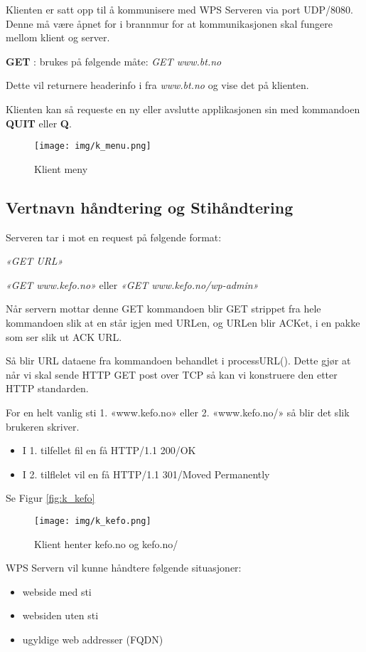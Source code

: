 \documentclass[norsk,a4paper]{article}
\begin{document}
Klienten er satt opp til å kommunisere med WPS Serveren via port UDP/8080.
Denne må være åpnet for i brannmur for at kommunikasjonen skal fungere mellom klient og server.

\textbf{GET} : brukes på følgende måte:
\textit{GET www.bt.no}

Dette vil returnere headerinfo i fra \textit{www.bt.no} og vise det på klienten.

Klienten kan så requeste en ny eller avslutte applikasjonen sin med kommandoen \textbf{QUIT} eller \textbf{Q}.

\begin{figure}[ht!]
  \texttt{[image: img/k\_menu.png]}
  \caption{Klient meny}
  \label{fig:klient_meny}
\end{figure}

\subsection{Vertnavn håndtering og Stihåndtering}
Serveren tar i mot en request på følgende format:

\textit{«GET URL»}

\textit{«GET www.kefo.no»} eller \textit{«GET www.kefo.no/wp-admin»}

Når servern mottar denne GET kommandoen blir GET strippet fra hele kommandoen slik at en står igjen med URLen, og URLen blir ACKet, i en pakke som ser slik ut ACK URL.

Så blir URL dataene fra kommandoen behandlet i processURL().
Dette gjør at når vi skal sende HTTP GET post over TCP så kan vi konstruere den etter HTTP standarden.

For en helt vanlig sti 1. «www.kefo.no» eller 2. «www.kefo.no/» så blir det slik brukeren skriver.
\begin{itemize}
  \item I 1. tilfellet fil en få HTTP/1.1 200/OK
  \item I 2. tilflelet vil en få HTTP/1.1 301/Moved Permanently
\end{itemize}

Se Figur \eqref{fig:k_kefo}

\begin{figure}[ht!]
  \texttt{[image: img/k\_kefo.png]}
  \caption{Klient henter kefo.no og kefo.no/}
  \label{fig:k_kefo}
\end{figure}

WPS Servern vil kunne håndtere følgende situasjoner:
\begin{itemize}
  \item webside med sti
  \item websiden uten sti
  \item ugyldige web addresser (FQDN)
\end{itemize}
\end{document}
